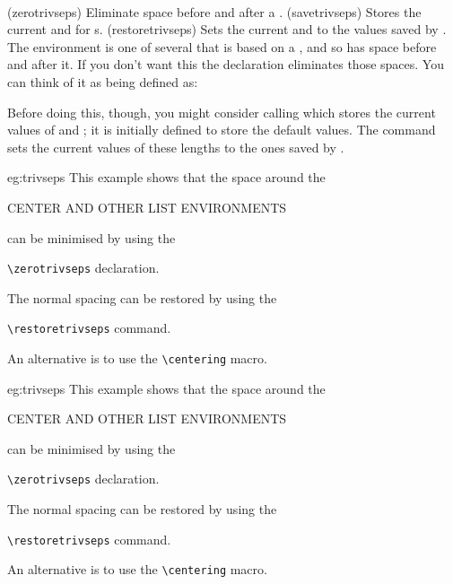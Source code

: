 \begin{syntax}
\cmd{\zerotrivseps} \cmd{\savetrivseps} \cmd{\restoretrivseps} \\
\end{syntax}
\glossary(zerotrivseps)%
  {}%
  {Eliminate space before and after a .}
\glossary(savetrivseps)%
  {}%
  {Stores the current  and  for s.}
\glossary(restoretrivseps)%
  {}%
  {Sets the current  and  to the values saved
   by .}
The  environment is one of several that is based on
a , and so has space before and after it. If you don't want this
the \cmd{\zerotrivseps} declaration eliminates those spaces. You can
think of it as being defined as:
\begin{lcode}
\newcommand*{\zerotrivseps}{%
  \setlength{\topsep}{0pt}%
  \setlength{\partopsep}{0pt}}
\end{lcode}
Before doing this, though, you might consider calling \cmd{\savetrivseps} 
which stores the current values of \lnc{\topsep} and \lnc{\partopsep};
it is initially defined to store the default values.
The command \cmd{\restoretrivseps} sets the current values of these
lengths to the ones saved by \cmd{\savetrivseps}.

\begin{egresult}{eg:trivseps}
\restoretrivseps%
This example shows that the space around the \onelineskip
\begin{center}
CENTER AND OTHER LIST ENVIRONMENTS
\end{center}
can be minimised by using the \zerotrivseps
\begin{center}
\verb?\zerotrivseps? declaration.
\end{center}
The normal spacing can be restored by using the \restoretrivseps {}\onelineskip
\begin{center}
\verb?\restoretrivseps? command.
\end{center}
An alternative is to use the \verb?\centering? macro.
\end{egresult}


\begin{egsource}{eg:trivseps}
This example shows that the space around the
\begin{center}
CENTER AND OTHER LIST ENVIRONMENTS
\end{center}
can be minimised by using the \zerotrivseps
\begin{center}
\verb?\zerotrivseps? declaration.
\end{center}
The normal spacing can be restored by using the \restoretrivseps
\begin{center}
\verb?\restoretrivseps? command.
\end{center}
An alternative is to use the \verb?\centering? macro.
\end{egsource}

